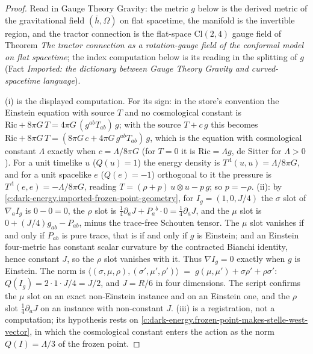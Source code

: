 \documentclass[11pt]{article}
\theoremstyle{definition}
\theoremstyle{plain}
\providecommand{\Cl}{}\renewcommand{\Cl}{\mathrm{Cl}}
\providecommand{\Ric}{}\renewcommand{\Ric}{\mathrm{Ric}}
\providecommand{\hb}{}\renewcommand{\hb}{\bar{h}}
\providecommand{\ip}{}\renewcommand{\ip}[2]{\langle #1, #2\rangle}
\begin{document}
\begin{proof}
Read in Gauge Theory Gravity: the metric $g$ below is the derived metric of the gravitational field $(\hb, \Omega)$ on flat spacetime, the manifold is the invertible region, and the tractor connection is the flat-space $\Cl(2,4)$ gauge field of Theorem \emph{The tractor connection as a rotation-gauge field of the conformal model on flat spacetime}; the index computation below is its reading in the splitting of $g$ (Fact \emph{Imported: the dictionary between Gauge Theory Gravity and curved-spacetime language}).

(i) is the displayed computation. For its sign: in the store's convention the Einstein equation with source $T$ and no cosmological constant is $\Ric + 8\pi G\,T = 4\pi G\,(g^{ab}T_{ab})\,g$; with the source $T + c\,g$ this becomes $\Ric + 8\pi G\,T = (8\pi G\,c + 4\pi G\,g^{ab}T_{ab})\,g$, which is the equation with cosmological constant $\Lambda$ exactly when $c = \Lambda/8\pi G$ (for $T = 0$ it is $\Ric = \Lambda g$, de Sitter for $\Lambda > 0$). For a unit timelike $u$ ($Q(u) = 1$) the energy density is $T^{\Lambda}(u, u) = \Lambda/8\pi G$, and for a unit spacelike $e$ ($Q(e) = -1$) orthogonal to it the pressure is $T^{\Lambda}(e, e) = -\Lambda/8\pi G$, reading $T = (\rho + p)\,u\otimes u - p\,g$; so $p = -\rho$. (ii): by \ref{c:dark-energy.imported-frozen-point-geometry}, for $I_g = (1, 0, J/4)$ the $\sigma$ slot of $\nabla_a I_g$ is $0 - 0 = 0$, the $\rho$ slot is $\tfrac14\partial_a J + P_a{}^b\cdot 0 = \tfrac14\partial_a J$, and the $\mu$ slot is $0 + (J/4)g_{ab} - P_{ab}$, minus the trace-free Schouten tensor. The $\mu$ slot vanishes if and only if $P_{ab}$ is pure trace, that is if and only if $g$ is Einstein; and an Einstein four-metric has constant scalar curvature by the contracted Bianchi identity, hence constant $J$, so the $\rho$ slot vanishes with it. Thus $\nabla I_g = 0$ exactly when $g$ is Einstein. The norm is $\ip{(\sigma,\mu,\rho)}{(\sigma',\mu',\rho')} \;=\; g(\mu,\mu') + \sigma\rho' + \rho\sigma'$: $Q(I_g) = 2\cdot 1\cdot J/4 = J/2$, and $J = R/6$ in four dimensions. The script confirms the $\mu$ slot on an exact non-Einstein instance and on an Einstein one, and the $\rho$ slot $\tfrac14\partial_a J$ on an instance with non-constant $J$. (iii) is a registration, not a computation; its hypothesis rests on \ref{c:dark-energy.frozen-point-makes-stelle-west-vector}, in which the cosmological constant enters the action as the norm $Q(I) = \Lambda/3$ of the frozen point.

\end{proof}
\end{document}
